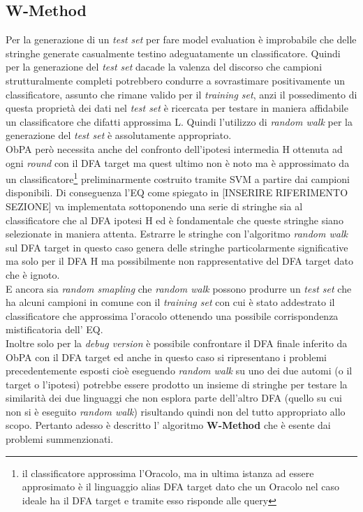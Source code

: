 \subsection{W-Method}
\label{sub:wme}
Per la generazione di un \textit{test set} per fare model evaluation  è improbabile che delle stringhe generate casualmente testino adeguatamente un classificatore. Quindi per la generazione del \textit{test set} dacade la valenza del discorso che campioni strutturalmente completi potrebbero condurre a sovrastimare positivamente un classificatore, assunto che rimane valido per il \textit{training set}, anzi il possedimento di questa proprietà dei dati nel \textit{test set} è ricercata per testare in maniera affidabile un classificatore che difatti approssima \ac{L}. Quindi l'utilizzo di \textit{random walk} per la generazione del \textit{test set} è assolutamente appropriato. \\   \ac{ObPA} però necessita anche del confronto dell'ipotesi intermedia \ac{H} ottenuta ad ogni \textit{round} con il \ac{DFA} target ma quest ultimo non è noto ma è approssimato da un classificatore\footnote{il classificatore approssima l'Oracolo, ma in ultima istanza ad essere approsimato è il linguaggio alias \ac{DFA} target dato che un Oracolo nel caso ideale ha il \ac{DFA} target e tramite esso risponde alle query} preliminarmente costruito tramite \ac{SVM} a partire dai campioni disponibili.   Di conseguenza l'\ac{EQ} come spiegato in [INSERIRE RIFERIMENTO SEZIONE] va implementata sottoponendo  una serie di stringhe sia al classificatore che al \ac{DFA} ipotesi \ac{H} ed è fondamentale che queste stringhe siano selezionate in maniera attenta. Estrarre le stringhe con l'algoritmo \textit{random walk} sul \ac{DFA} target in questo caso genera delle stringhe particolarmente significative ma solo per il \ac{DFA} \ac{H} ma possibilmente non rappresentative del \ac{DFA} target dato che è ignoto.\\
 E ancora sia  \textit{random smapling} che \textit{random walk} possono produrre un \textit{test set} che ha alcuni campioni in comune con il \textit{training set} con cui è stato addestrato il classificatore che approssima l'oracolo ottenendo una possibile corrispondenza mistificatoria dell' \ac{EQ}.\\
 Inoltre solo per la \textit{debug version} è possibile confrontare il \ac{DFA} finale inferito da \ac{ObPA} con il \ac{DFA} target ed anche in questo caso si ripresentano i problemi precedentemente esposti cioè eseguendo \textit{random walk} su uno dei due automi (o il target o l'ipotesi) potrebbe essere prodotto un insieme di stringhe per testare la similarità dei due linguaggi che non esplora parte dell'altro \ac{DFA} (quello su cui non si è eseguito \textit{random walk}) risultando quindi non del tutto appropriato allo scopo. Pertanto adesso è descritto l' algoritmo \textbf{W-Method} \cite{Chow78} che è esente dai problemi summenzionati.

